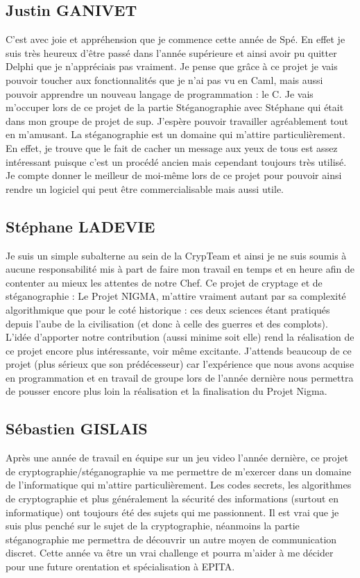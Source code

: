 \documentclass[a4paper,12pt]{article}
\begin{document}
\subsection{Justin GANIVET}

C'est avec joie et appréhension que je commence cette année de Spé. En effet je suis très heureux d'être passé dans l'année supérieure et ainsi avoir pu quitter Delphi que je  n'appréciais pas vraiment. Je pense que grâce à ce projet je vais pouvoir toucher aux fonctionnalités que je n'ai pas vu en Caml, mais aussi pouvoir apprendre un nouveau langage de programmation : le C. Je vais m'occuper lors de ce projet de la partie Stéganographie avec Stéphane qui était dans mon groupe de projet de sup. J'espère pouvoir travailler agréablement tout en m'amusant. La stéganographie est un domaine qui m'attire particulièrement. En effet, je trouve que le fait de cacher un message aux yeux de tous est assez intéressant puisque c'est un procédé ancien mais cependant toujours très utilisé. Je compte donner le meilleur de moi-même lors de ce projet pour pouvoir ainsi rendre un logiciel qui peut être commercialisable mais aussi utile.


\subsection{Stéphane LADEVIE}

Je suis un simple subalterne au sein de la CrypTeam et ainsi je ne suis soumis à aucune responsabilité mis à part de faire mon travail en temps et en heure afin de contenter au mieux les attentes de notre Chef. Ce projet de cryptage et de stéganographie : Le Projet NIGMA, m'attire vraiment autant par sa complexité algorithmique que pour le coté historique : ces deux sciences étant pratiqués depuis l'aube de la civilisation (et donc à celle des guerres et des complots). L'idée d'apporter notre contribution (aussi minime soit elle) rend la réalisation de ce projet encore plus intéressante, voir même excitante. J'attends beaucoup de ce projet (plus sérieux que son prédécesseur) car l'expérience que nous avons acquise en programmation et en travail de groupe lors de l'année dernière nous permettra de pousser encore plus loin la réalisation et la finalisation du Projet Nigma.

\subsection{Sébastien GISLAIS}

Après une année de travail en équipe sur un jeu video l'année dernière, ce projet de cryptographie/stéganographie va me permettre de m'exercer dans un domaine de l'informatique qui m'attire particulièrement. Les codes secrets, les algorithmes de cryptographie et plus généralement la sécurité des informations (surtout en informatique) ont toujours été des sujets qui me passionnent. Il est vrai que je suis plus penché sur le sujet de la cryptographie, néanmoins la partie stéganographie me permettra de découvrir un autre moyen de communication discret. Cette année va être un vrai challenge et pourra m'aider à me décider pour une future orentation et spécialisation à EPITA.
\end{document}
